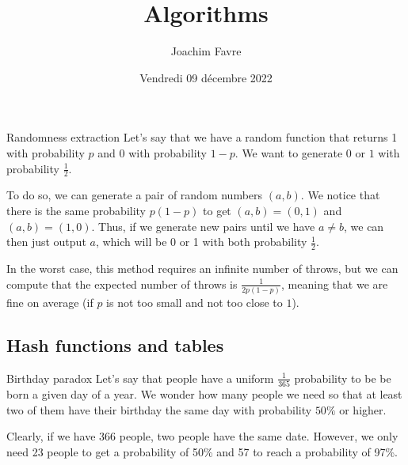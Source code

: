 \documentclass[a4paper]{article}
\title{Algorithms}
\author{Joachim Favre}
\date{Vendredi 09 décembre 2022}
\begin{document}
\maketitle


\begin{parag}{Randomness extraction}
    Let's say that we have a random function that returns 1 with probability $p$ and $0$ with probability $1-p$. We want to generate $0$ or $1$ with probability $\frac{1}{2}$. 

    To do so, we can generate a pair of random numbers $\left(a, b\right)$. We notice that there is the same probability $p\left(1-p\right)$ to get $\left(a, b\right) = \left(0, 1\right)$ and $\left(a, b\right) = \left(1, 0\right)$. Thus, if we generate new pairs until we have $a \neq b$, we can then just output $a$, which will be 0 or 1 with both probability $\frac{1}{2}$.

    In the worst case, this method requires an infinite number of throws, but we can compute that the expected number of throws is $\frac{1}{2p\left(1-p\right)}$, meaning that we are fine on average (if $p$ is not too small and not too close to $1$).
\end{parag}

\subsection{Hash functions and tables}
\begin{parag}{Birthday paradox}
    Let's say that people have a uniform $\frac{1}{365}$ probability to be be born a given day of a year. We wonder how many people we need so that at least two of them have their birthday the same day with probability $50\%$ or higher.

    Clearly, if we have 366 people, two people have the same date. However, we only need 23 people to get a probability of 50\% and 57 to reach a probability of 97\%.
\end{parag}
\end{document}
